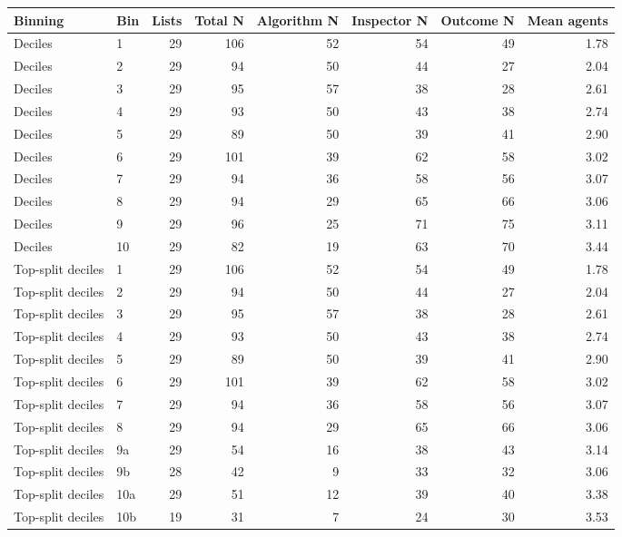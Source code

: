 \begin{tabular}{llrrrrrr}
\toprule
Binning & Bin & Lists & Total N & Algorithm N & Inspector N & Outcome N & Mean agents \\
\midrule
Deciles & 1 & 29 & 106 & 52 & 54 & 49 &  1.78 \\
Deciles & 2 & 29 & 94 & 50 & 44 & 27 &  2.04 \\
Deciles & 3 & 29 & 95 & 57 & 38 & 28 &  2.61 \\
Deciles & 4 & 29 & 93 & 50 & 43 & 38 &  2.74 \\
Deciles & 5 & 29 & 89 & 50 & 39 & 41 &  2.90 \\
Deciles & 6 & 29 & 101 & 39 & 62 & 58 &  3.02 \\
Deciles & 7 & 29 & 94 & 36 & 58 & 56 &  3.07 \\
Deciles & 8 & 29 & 94 & 29 & 65 & 66 &  3.06 \\
Deciles & 9 & 29 & 96 & 25 & 71 & 75 &  3.11 \\
Deciles & 10 & 29 & 82 & 19 & 63 & 70 &  3.44 \\
Top-split deciles & 1 & 29 & 106 & 52 & 54 & 49 &  1.78 \\
Top-split deciles & 2 & 29 & 94 & 50 & 44 & 27 &  2.04 \\
Top-split deciles & 3 & 29 & 95 & 57 & 38 & 28 &  2.61 \\
Top-split deciles & 4 & 29 & 93 & 50 & 43 & 38 &  2.74 \\
Top-split deciles & 5 & 29 & 89 & 50 & 39 & 41 &  2.90 \\
Top-split deciles & 6 & 29 & 101 & 39 & 62 & 58 &  3.02 \\
Top-split deciles & 7 & 29 & 94 & 36 & 58 & 56 &  3.07 \\
Top-split deciles & 8 & 29 & 94 & 29 & 65 & 66 &  3.06 \\
Top-split deciles & 9a & 29 & 54 & 16 & 38 & 43 &  3.14 \\
Top-split deciles & 9b & 28 & 42 & 9 & 33 & 32 &  3.06 \\
Top-split deciles & 10a & 29 & 51 & 12 & 39 & 40 &  3.38 \\
Top-split deciles & 10b & 19 & 31 & 7 & 24 & 30 &  3.53 \\
\bottomrule
\end{tabular}
